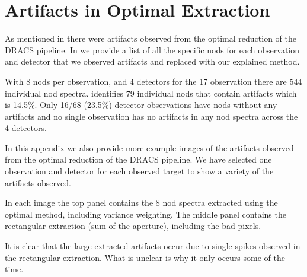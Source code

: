 
\chapter{Artifacts in Optimal Extraction} %

\label{appendix:artifacts}




As mentioned in  there were artifacts observed from the optimal reduction of the DRACS pipeline. In  we provide a list of all the specific nods for each observation and detector that we observed artifacts and replaced with our explained method.  

With 8 nods per observation, and 4 detectors for the 17 observation there are 544 individual nod spectra.  identifies 79 individual nods that contain artifacts which is 14.5\%.   Only 16/68 (23.5\%) detector observations have nods without any artifacts and no single observation has no artifacts in any nod spectra across the 4 detectors.




In this appendix we also provide more example images of the artifacts observed from the optimal reduction of the DRACS pipeline. We have selected one observation and detector for each observed target to show a variety of the artifacts observed.

In each image the top panel contains the 8 nod spectra extracted using the optimal method, including variance weighting. The middle panel contains the rectangular extraction (sum of the aperture), including the bad pixels.

It is clear that the large extracted artifacts occur due to single spikes observed in the rectangular extraction. What is unclear is why it only occurs some of the time.
 

 
